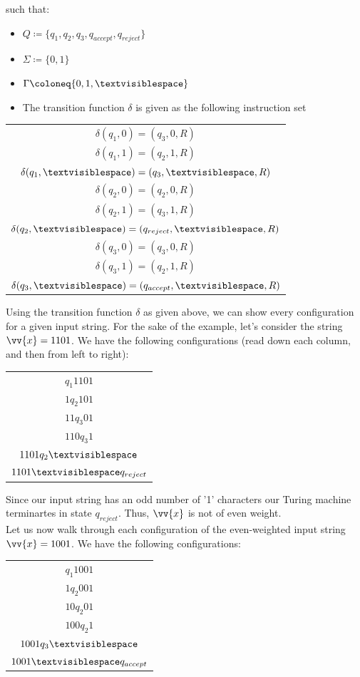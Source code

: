 \documentclass{article}
\begin{document}
\begin{exmp}
\noindent such that:
\begin{itemize}
	\item $Q \coloneq \{ q_{1}, q_{2}, q_{3}, q_{accept}, q_{reject} \}$
	\item $\Sigma \coloneq \{ 0, 1 \}$
	\item $\Gamma \coloneq \{ 0, 1, \textvisiblespace \}$
	\item The transition function $\delta$ is given as the following instruction set
\end{itemize}
\begin{center}
	\begin{tabular}{ c }
	$\delta(q_{1}, 0) = (q_{3}, 0, R)$ \\
	$\delta(q_{1}, 1) = (q_{2}, 1, R)$ \\
	$\delta(q_{1}, \textvisiblespace) = (q_{3}, \textvisiblespace, R)$ \\
	$\delta(q_{2}, 0) = (q_{2}, 0, R)$ \\
	$\delta(q_{2}, 1) = (q_{3}, 1, R)$ \\
	$\delta(q_{2}, \textvisiblespace) = (q_{reject}, \textvisiblespace, R)$ \\
	$\delta(q_{3}, 0) = (q_{3}, 0, R)$ \\
	$\delta(q_{3}, 1) = (q_{2}, 1, R)$ \\
	$\delta(q_{3}, \textvisiblespace) = (q_{accept}, \textvisiblespace, R)$
	\end{tabular}
\end{center}
\noindent Using the transition function $\delta$ as given above, we can show every configuration for a given input string.  For the sake of the example, let's consider the string $\vv{x} = 1101$.  We have the following configurations (read down each column, and then from left to right):
\begin{center}
\begin{tabular}{ c }
	$q_{1}1101$ \\
	$1q_{2}101$ \\
	$11q_{3}01$ \\
	$110q_{3}1$ \\
	$1101q_{2} \textvisiblespace$ \\
	$1101 \textvisiblespace q_{reject}$
\end{tabular}
\end{center}
\noindent Since our input string has an odd number of '1' characters our Turing machine terminartes in state $q_{reject}$. Thus, $\vv{x}$ is not of even weight. \\

\noindent Let us now walk through each configuration of the even-weighted input string $\vv{x} = 1001$.  We have the following configurations:
\begin{center}
\begin{tabular}{ c }
	$q_{1}1001$ \\
	$1q_{2}001$ \\
	$10q_{2}01$ \\
	$100q_{2}1$ \\
	$1001q_{3}\textvisiblespace$ \\
	$1001\textvisiblespace q_{accept}$
\end{tabular}
\end{center}
\end{exmp}
\end{document}
